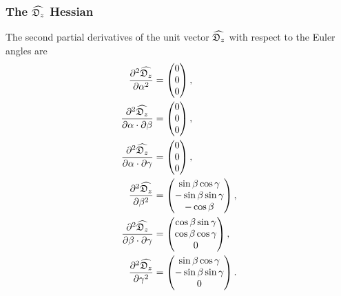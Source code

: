 \subsubsection{The $\widehat{\mathfrak{D}_z}$ Hessian}

The second partial derivatives of the unit vector $\widehat{\mathfrak{D}_z}$ with respect to the Euler angles are
\begin{subequations}
\begin{align}
    \frac{\partial^2 \widehat{\mathfrak{D}_z}}{\partial \alpha^2} &= \begin{pmatrix}
        0 \\
        0 \\
        0 \\
    \end{pmatrix}, \\
    \frac{\partial^2 \widehat{\mathfrak{D}_z}}{\partial \alpha \cdot \partial \beta} &= \begin{pmatrix}
        0 \\
        0 \\
        0 \\
    \end{pmatrix}, \\
    \frac{\partial^2 \widehat{\mathfrak{D}_z}}{\partial \alpha \cdot \partial \gamma} &= \begin{pmatrix}
        0 \\
        0 \\
        0 \\
    \end{pmatrix}, \\
    \frac{\partial^2 \widehat{\mathfrak{D}_z}}{\partial \beta^2} &= \begin{pmatrix}
        \sin \beta \cos \gamma \\
        -\sin \beta \sin \gamma \\
        -\cos \beta \\
    \end{pmatrix}, \\
    \frac{\partial^2 \widehat{\mathfrak{D}_z}}{\partial \beta \cdot \partial \gamma} &= \begin{pmatrix}
        \cos \beta \sin \gamma \\
        \cos \beta \cos \gamma \\
        0 \\
    \end{pmatrix}, \\
    \frac{\partial^2 \widehat{\mathfrak{D}_z}}{\partial \gamma^2} &= \begin{pmatrix}
        \sin \beta \cos \gamma \\
        -\sin \beta \sin \gamma \\
        0 \\
    \end{pmatrix}.
\end{align}
\end{subequations}




